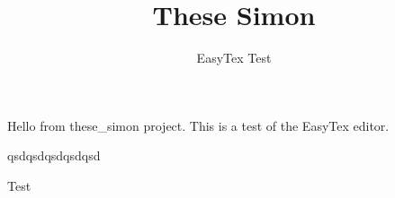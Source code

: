 \documentclass{article}
\begin{document}
\title{These Simon}
\author{EasyTex Test}
\maketitle

Hello from these\_simon project.
This is a test of the EasyTex editor.

qsdqsdqsdqsdqsd

Test
\end{document}
